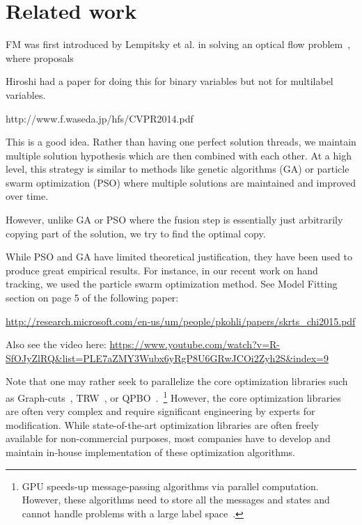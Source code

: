 \section{Related work}

FM was first introduced by Lempitsky et al. in solving an optical flow
problem~\cite{first_fusion_viktor}, where proposals

Hiroshi had a paper for doing this for binary variables but not for multilabel variables.

http://www.f.waseda.jp/hfs/CVPR2014.pdf

 This is a good idea.  Rather than having one perfect solution threads, we maintain multiple solution hypothesis which are then combined with each other.  At a high level, this strategy is similar to methods like genetic algorithms (GA) or particle swarm optimization (PSO) where multiple solutions are maintained and improved over time.

 

However, unlike GA or PSO where the fusion step is essentially just arbitrarily copying part of the solution, we try to find the optimal copy.

 

While PSO and GA have limited theoretical justification, they have been
used to produce great empirical results. For instance, in our recent
work on hand tracking, we used the particle swarm optimization
method. See Model Fitting section on page 5 of the following paper:

\url{http://research.microsoft.com/en-us/um/people/pkohli/papers/skrts_chi2015.pdf}

Also see the video here: \url{https://www.youtube.com/watch?v=R-SfOJyZlRQ&list=PLE7aZMY3Wubx6yRgP8U6GRwJCOi2Zyh2S&index=9}

 



 
Note that one may rather seek to parallelize the core optimization
libraries such as Graph-cuts~\cite{}, TRW~\cite{kolmogorov}, or
QPBO~\cite{}.~\footnote{GPU speeds-up message-passing algorithms via
parallel computation. However, these algorithms need to store all the
messages and states and cannot handle problems with a large label space~\cite{layered_depthmap}.} However, the core optimization libraries are often
very complex and require significant engineering by experts for
modification.
%
While state-of-the-art optimization libraries are often freely available for
non-commercial purposes, most companies have to develop and maintain
in-house implementation of these optimization algorithms.
